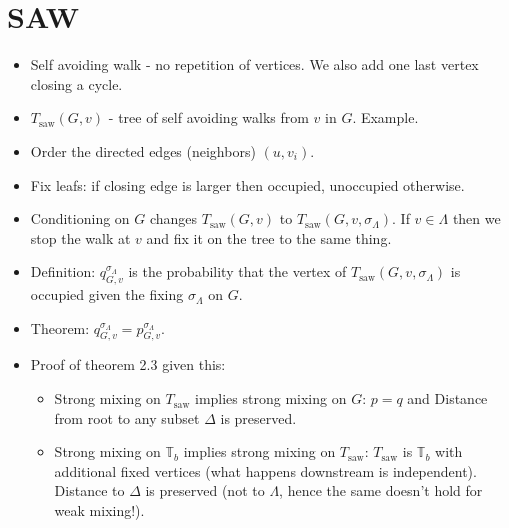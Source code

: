 \documentclass[11pt]{article} \usepackage{amssymb}
\newcommand{\tree}{\mathbb{T}}
\newcommand{\saw}{\mathrm{saw}}
\begin{document}
\section{SAW}
\begin{itemize}
\item Self avoiding walk - no repetition of vertices. We also add one
  last vertex closing a cycle.
\item $T_\saw(G,v)$ - tree of self avoiding walks from $v$ in $G$. Example.
\item Order the directed edges (neighbors) $(u,v_i)$.
\item Fix leafs: if closing edge is larger then occupied, unoccupied otherwise.
\item Conditioning on $G$ changes $T_\saw(G,v)$ to
  $T_\saw(G,v,\sigma_\Lambda)$. If $v \in \Lambda$ then we stop the walk at $v$
  and fix it on the tree to the same thing.
\item Definition: $q_{G,v}^{\sigma_\Lambda}$ is the probability that
  the vertex of $T_\saw(G,v,\sigma_\Lambda)$ is occupied given the
  fixing $\sigma_\Lambda$ on $G$.
\item Theorem: $q_{G,v}^{\sigma_\Lambda}=p_{G,v}^{\sigma_\Lambda}$.
\item Proof of theorem 2.3 given this:
  \begin{itemize}
  \item Strong mixing on $T_\saw$ implies strong mixing on $G$: $p=q$
    and Distance from root to any subset $\Delta$ is preserved. 
  \item Strong mixing on $\tree_b$ implies strong mixing on $T_\saw$:
    $T_\saw$ is $\tree_b$ with additional fixed vertices (what happens
    downstream is independent). Distance to $\Delta$ is preserved (not
    to $\Lambda$, hence the same doesn't hold for weak mixing!).
  \end{itemize}
\end{itemize}
\end{document}
